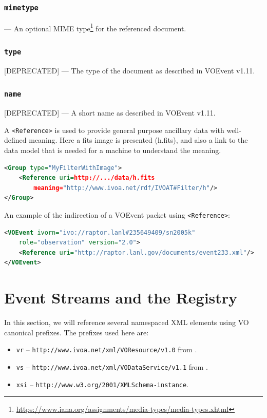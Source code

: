 \documentclass[11pt,a4paper]{ivoa}
\begin{document}
\subsubsection{\tt mimetype}\label{sec:3.9.3}--- An optional MIME type\footnote{
\url{https://www.iana.org/assignments/media-types/media-types.xhtml}} for the 
referenced document. 
\subsubsection{\tt type}\label{sec:3.9.4}[DEPRECATED] --- The type of the 
document as described in VOEvent v1.11. 
\subsubsection{\tt name}\label{sec:3.9.5}[DEPRECATED] --- A short name as 
described in VOEvent v1.11. 

A {\tt <Reference>} is used to provide general purpose ancillary data with 
well-defined meaning. Here a fits image is presented (h.fits), and also a link 
to the data model that is needed for a machine to understand the meaning. 
\begin{lstlisting}[language=XML]
<Group type="MyFilterWithImage">
    <Reference uri=http://.../data/h.fits 
        meaning="http://www.ivoa.net/rdf/IVOAT#Filter/h"/>
</Group> 
\end{lstlisting}
An example of the indirection of a VOEvent packet using {\tt <Reference>}:  
\begin{lstlisting}[language=XML]
<VOEvent ivorn="ivo://raptor.lanl#235649409/sn2005k" 
    role="observation" version="2.0">   
    <Reference uri="http://raptor.lanl.gov/documents/event233.xml"/>
</VOEvent> 
\end{lstlisting}

\section{Event Streams and the Registry}
\label{sec:registry-matters}

In this section, we will reference several namespaced XML elements using
VO canonical prefixes.  The prefixes used here are:

\begin{itemize}
\item \verb|vr| -- \nolinkurl{http://www.ivoa.net/xml/VOResource/v1.0}
from \citet{2018ivoa.spec.0625P}.
\item \verb|vs| --
\nolinkurl{http://www.ivoa.net/xml/VODataService/v1.1}
from \citet{std:VODS11}.
\item \verb|xsi| --
\nolinkurl{http://www.w3.org/2001/XMLSchema-instance}.
\end{itemize}
\end{document}
